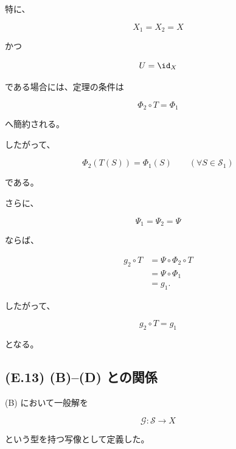 \documentclass[a4paper,11pt]{article}
\newcommand{\Solver}{\mathcal{S}}
\begin{document}
特に、

\begin{equation}
    X_1=X_2=X
\end{equation}

かつ

\begin{equation}
    U=\id_X
\end{equation}

である場合には、定理の条件は

\begin{equation}
    \Phi_2\circ T
    =
    \Phi_1
\end{equation}

へ簡約される。

したがって、

\begin{equation}
    \boxed{
        \Phi_2(T(S))
        =
        \Phi_1(S)
        \qquad
        (\forall S\in\Solver_1)
    }
\end{equation}

である。

さらに、

\begin{equation}
    \Psi_1=\Psi_2=\Psi
\end{equation}

ならば、

\begin{align}
    g_2\circ T
    &=
    \Psi\circ\Phi_2\circ T
    \\
    &=
    \Psi\circ\Phi_1
    \\
    &=
    g_1.
\end{align}

したがって、

\begin{equation}
    \boxed{
        g_2\circ T=g_1
    }
\end{equation}

となる。


\subsection{(E.13) (B)--(D) との関係}
\label{subsec:E13}

(B) において一般解を

\begin{equation}
    \mathcal{G}:
    \Solver\to X
\end{equation}

という型を持つ写像として定義した。
\end{document}
